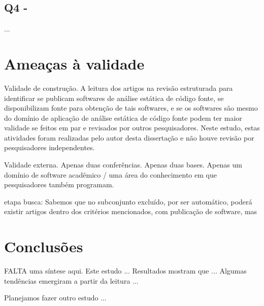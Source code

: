 
\subsection{Q4 - \EstudoUmQuestaoQuatro}

...

\section{Ameaças à validade}

Validade de construção.
A leitura dos artigos na revisão estruturada para identificar se publicam
softwares de análise estática de código fonte, se disponibilizam fonte para
obtenção de tais softwares, e se os softwares são mesmo do domínio de aplicação
de análise estática de código fonte podem ter maior validade se feitos em
par e revisados por outros pesquisadores.
Neste estudo, estas atividades foram realizadas pelo autor desta dissertação e 
não houve revisão por pesquisadores independentes.

Validade externa. Apenas duas conferências. Apenas duas bases. Apenas um domínio de software acadêmico / uma área do conhecimento em que pesquisadores também programam.

etapa busca: Sabemos que no subconjunto excluído, por ser automático, poderá existir artigos
dentro dos critérios mencionados, com publicação de software, mas 

\section{Conclusões} \label{estudo1:conclusoes}

FALTA uma síntese aqui. 
Este estudo ...
Resultados mostram que ...
Algumas tendências emergiram a partir da leitura ...

Planejamos fazer outro estudo ... 

